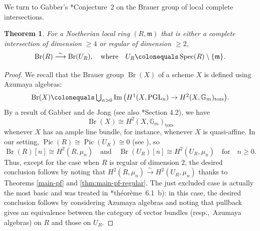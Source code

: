 \documentclass[11pt, reqno]{amsart}
\newcommand{\bG}{\mathbb{G}}
\newcommand{\bZ}{\mathbb{Z}}
\newcommand{\fm}{\mathfrak{m}}
\DeclareMathOperator{\Br}{Br}			%
\DeclareMathOperator{\im}{Im}			%
\DeclareMathOperator{\PGL}{PGL}		%
\DeclareMathOperator{\Pic}{Pic}		%
\DeclareMathOperator{\Spec}{Spec}		%
\newcommand{\ce}{\colonequals}
\newcommand{\isomto}{\overset{\sim}{\longrightarrow}}
\providecommand{\p}[1]{\left(#1\right)}
\newcommand{\ra}{\rightarrow}
\newcommand{\tors}{\mathrm{tors}}		%
\newcommand{\xra}{\xrightarrow}
\newcommand{\beg}{\begin{eg}}
\newcommand{\eeg}{\end{eg}}
\providecommand{\qxq}[1]{\quad\text{#1}\quad}
\newcommand{\tst}{\textstyle}
\newcommand{\be}{\begin{equation}}
\newcommand{\ee}{\end{equation}}
\newcommand{\bpf}{\begin{proof}}
\newcommand{\epf}{\end{proof}}
\newcommand{\bthm}{\begin{thm}}
\newcommand{\ethm}{\end{thm}}
\numberwithin{equation}{numberingbase}
\theoremstyle{thms}
\newtheorem{thm}[numberingbase]{Theorem}
\theoremstyle{claims}
\theoremstyle{defs}
\newtheorem{eg}[numberingbase]{Example}
\theoremstyle{thms}
\theoremstyle{defs}
\theoremstyle{subsection-tweak}
\theoremstyle{subsection-tweak}
\begin{document}



We turn to Gabber's \cite{Gab04}*{Conjecture~2} on the Brauer group of local complete intersections.



\bthm%
\label{deg-3-case}
For a Noetherian local ring $(R, \fm)$ that is either a complete intersection of dimension $\ge 4$ or regular of dimension $\ge 2$,
\[
\Br(R) \isomto \Br(U_R), \qxq{where} U_R \ce \Spec(R) \setminus \{ \fm\}. 
\]
\ethm




\bpf
We recall that the Brauer group $\Br(X)$ of a scheme $X$ is defined using Azumaya algebras:
\[
\tst \Br(X) \ce \bigcup_{n > 0} \im\p{H^1(X, \PGL_n) \ra H^2(X, \bG_m)_\tors}\!.
\]
By a result of Gabber and de Jong \cite{dJ02} (see also \cite{CTS21}*{Section 4.2}), we have 
\[
\Br(X) \cong H^2(X, \bG_m)_\tors
\]
whenever $X$ has an ample line bundle, for instance, whenever $X$ is quasi-affine. In our setting, %
$\Pic(R) \cong \Pic(U_R) \cong 0$ (see %
), so 
\[
\Br(R)[n] \cong H^2(R, \mu_n) \qxq{and} \Br(U_R)[n] \cong H^2(U_R, \mu_n) \qxq{for} n \ge 0.
\]
Thus, except for the case when $R$ is regular of dimension $2$, the desired conclusion follows by noting that $H^2(R, \mu_n) \isomto H^2(U_R, \mu_n)$ thanks to Theorems \ref{main-pf} and \ref{thm:main-pf-regular}. The just excluded case is actually the most basic and was treated in \cite{Gro68c}*{th\'{e}or\`{e}me~6.1~b)}: in this case, the desired conclusion follows by considering Azumaya algebras and noting that pullback gives an equivalence between the category of vector bundles (resp.,~Azumaya algebras) on $R$ and those on $U_R$.
\epf
\end{document}
